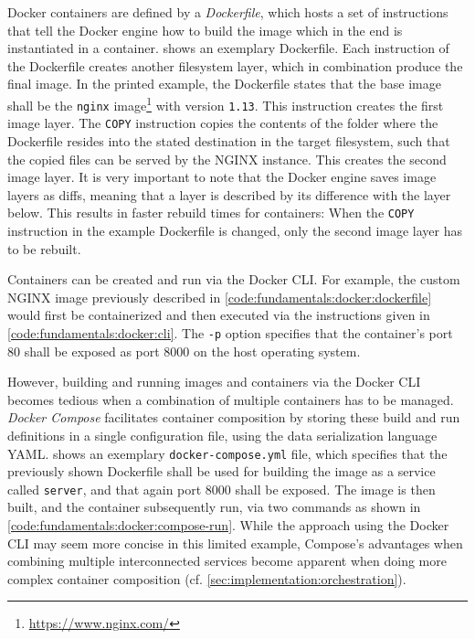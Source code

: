 Docker containers are defined by a \emph{Dockerfile}, which hosts a set of instructions that tell the Docker engine how to build the image which in the end is instantiated in a container.
 shows an exemplary Dockerfile.
Each instruction of the Dockerfile creates another filesystem layer, which in combination produce the final image.
In the printed example, the Dockerfile states that the base image shall be the \texttt{nginx} image\footnote{\url{https://www.nginx.com/}} with version \texttt{1.13}.
This instruction creates the first image layer.
The \texttt{COPY} instruction copies the contents of the folder where the Dockerfile resides into the stated destination in the target filesystem, such that the copied files can be served by the NGINX instance.
This creates the second image layer.
It is very important to note that the Docker engine saves image layers as diffs, meaning that a layer is described by its  difference with the layer below.
This results in faster rebuild times for containers: When the \texttt{COPY} instruction in the example Dockerfile is changed, only the second image layer has to be rebuilt.



Containers can be created and run via the Docker \ac{CLI}.
For example, the custom NGINX image previously described in \cref{code:fundamentals:docker:dockerfile} would first be containerized and then executed via the instructions given in \cref{code:fundamentals:docker:cli}.
The \texttt{-p} option specifies that the container's port 80 shall be exposed as port 8000 on the host operating system.



However, building and running images and containers via the Docker \ac{CLI} becomes tedious when a combination of multiple containers has to be managed.
\emph{Docker Compose} facilitates container composition by storing these build and run definitions in a single configuration file, using the data serialization language \ac{YAML}.
 shows an exemplary \texttt{docker-compose.yml} file, which specifies that  the previously shown Dockerfile shall be used for building the image as a service called \texttt{server}, and that again port 8000 shall be exposed.
The image is then built, and the container subsequently run, via two commands as shown in \cref{code:fundamentals:docker:compose-run}.
While the approach using the Docker CLI may seem more concise in this limited example, Compose's advantages when combining multiple interconnected services become apparent when doing more complex container composition (cf. \cref{sec:implementation:orchestration}).

